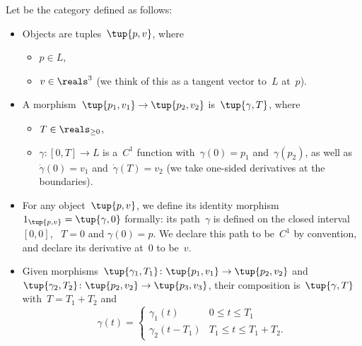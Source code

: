 \begin{definition}
  Let \Berg be the category defined as follows:
  \begin{itemize}
    \item Objects are tuples~$\tup{p,v}$, where
    \begin{itemize}
      \item $p \in L$,
      \item $v \in \reals^3$ (we think of this as a tangent vector to~$L$ at~$p$).
    \end{itemize}

    \item A morphism~$\tup{p_1, v_1} \to \tup{p_2, v_2}$ is~$\tup{\gamma, T}$,
    where
    \begin{itemize}
      \item $T \in \reals_{\geq 0}$,
      \item $\gamma \colon [0, T] \to L$ is a~$C^1$ function with~$\gamma(0)=p_1$ and~$\gamma(p_2)$, as well as~$\dot \gamma(0) = v_1$ and~$\dot \gamma(T) = v_2$  (we take one-sided derivatives at the boundaries).
    \end{itemize}
    \item For any object~$\tup{p, v}$, we define its identity morphism~$1_{\tup{p,v}} = \tup{\gamma, 0}$ formally: its path~$\gamma$ is defined on the closed interval~$[0,0]$, ~$T=0$ and $\gamma(0) = p$. We declare this path to be~$C^1$ by convention, and declare its derivative at~$0$ to be~$v$.

    \item Given morphisms~$\tup{\gamma_1, T_1}\colon \tup{p_1, v_1} \to \tup{p_2, v_2}$ and~$\tup{\gamma_2, T_2}\colon \tup{p_2, v_2} \to \tup{p_3, v_3}$, their composition is~$\tup{\gamma, T}$ with~$T = T_1 + T_2$ and
    \begin{equation}
      \gamma(t) = \begin{cases}
                    \gamma_1(t) &0 \leq t \leq T_1 \\
                    \gamma_2(t - T_1) & T_1 \leq t \leq T_1 + T_2.
      \end{cases}
    \end{equation}
  \end{itemize}
\end{definition}



